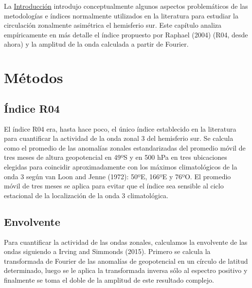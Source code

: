 \documentclass[12pt,oneside]{reedthesis}
\begin{document}
La \protect\hyperlink{intro}{Introducción} introdujo conceptualmente algunos aspectos problemáticos de las metodologías e índices normalmente utilizados en la literatura para estudiar la circulación zonalmente asimétrica el hemisferio sur.
Este capítulo analiza empíricamente en más detalle el índice propuesto por Raphael (2004) (R04, desde ahora) y la amplitud de la onda calculada a partir de Fourier.

\hypertarget{muxe9todos-1}{%
\section{Métodos}\label{muxe9todos-1}}

\hypertarget{uxedndice-r04}{%
\subsection{Índice R04}\label{uxedndice-r04}}

El índice R04 era, hasta hace poco, el único índice establecido en la literatura para cuantificar la actividad de la onda zonal 3 del hemisferio sur.
Se calcula como el promedio de las anomalías zonales estandarizadas del promedio móvil de tres meses de altura geopotencial en 49ºS y en 500 hPa en tres ubicaciones elegidas para coincidir aproximadamente con los máximos climatológicos de la onda 3 según van Loon and Jenne (1972): 50ºE, 166ºE y 76ºO.
El promedio móvil de tres meses se aplica para evitar que el índice sea sensible al ciclo estacional de la localización de la onda 3 climatológica.

\hypertarget{envolvente}{%
\subsection{Envolvente}\label{envolvente}}

Para cuantificar la actividad de las ondas zonales, calculamos la envolvente de las ondas siguiendo a Irving and Simmonds (2015).
Primero se calcula la transformada de Fourier de las anomalías de geopotencial en un círculo de latitud determinado, luego se le aplica la transformada inversa sólo al espectro positivo y finalmente se toma el doble de la amplitud de este resultado complejo.
\end{document}
